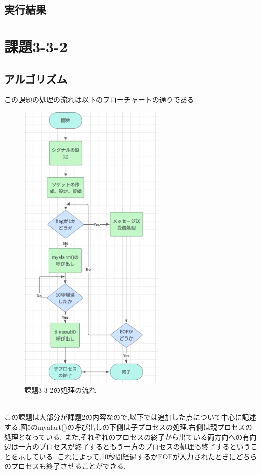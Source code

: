 \documentclass[dvipdfmx]{jarticle}
\begin{document}
\subsection{実行結果}
\section{課題3-3-2}
\subsection{アルゴリズム}
この課題の処理の流れは以下のフローチャートの通りである.
\begin{figure}[h]
    \centering
    \includegraphics[width=7cm]{3-3-2.png}
    \caption{課題3-3-2の処理の流れ}
\end{figure}
\\この課題は大部分が課題2の内容なので,以下では追加した点について中心に記述する.図5のmyalart()の呼び出しの下側は子プロセスの処理,右側は親プロセスの処理となっている.
また,それぞれのプロセスの終了から出ている両方向への有向辺は一方のプロセスが終了するともう一方のプロセスの処理も終了するということを示している.
これによって,10秒間経過するかEOFが入力されたときにどちらのプロセスも終了させることができる.
\end{document}
